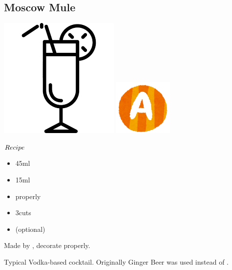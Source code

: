 \subsection{Moscow Mule}
\vspace{-7.4mm}
\hspace{39mm}
\includegraphics[scale=.07]{cocktail_glass_tall.png}
\includegraphics[scale=.12]{capital_a.png}
\vspace{2.5mm}
\begin{itembox}[l]{\boldmath $Recipe$}
\begin{itemize}
\setlength{\parskip}{0cm}
\setlength{\itemsep}{0cm}
\item \vodka 45ml
\item \limj 15ml
\item \ga properly
\item \lime 3cuts
\item \mint (optional)
\end{itemize}
\vspace{-4mm}
Made by \build, decorate \lime properly.
\end{itembox}
Typical Vodka-based cocktail. Originally Ginger Beer was used instead of \ga
\hspace{-1mm}.
